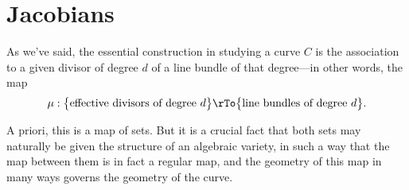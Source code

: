 

\chapter{Jacobians}\label{new Jacobians chapter}

%
%
%
%


As we've said, the essential construction in studying a curve $C$ is the association to a given divisor of degree $d$ of a line bundle of that degree---in other words, the map
$$
\mu : \big\{ \text{effective divisors of degree } d \big\} \rTo \big\{ \text{line bundles of degree } d \big\}.
$$

A priori, this is a map of sets. But it is a crucial fact that both sets may naturally be given the structure of an algebraic variety, in such a way that the map between them is in fact a regular map, and the geometry of this map in many ways governs the geometry of the curve.

